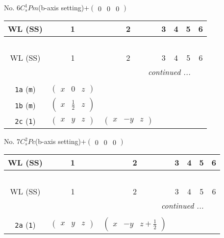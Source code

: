 \documentclass[fleqn,9pt,landscape]{jsarticle}
\begin{document}
\newpage
No. 6\quad$C_{s}^{1}$\quad$Pm$\quad(b-axis setting)\quad[ monoclinic ]\quad$+\begin{pmatrix} 0 & 0 & 0 \end{pmatrix}$
\begin{center}
\renewcommand{\arraystretch}{1.2}
\begin{longtable}{ccccccc}
 \hline \hline
WL (SS) & 1 & 2 & 3 & 4 & 5 & 6 \\ \hline \endfirsthead

\multicolumn{6}{l}{\tablename\ \thetable{}} \\
 \hline \hline
WL (SS) & 1 & 2 & 3 & 4 & 5 & 6 \\ \hline \endhead

 \hline \hline
\multicolumn{6}{r}{\footnotesize\it continued ...} \\ \endfoot

 \hline \hline
\multicolumn{6}{r}{} \\ \endlastfoot

{\tt 1a} ({\tt m}) & $ \begin{pmatrix} x & 0 & z \end{pmatrix} $ & $  $ \\ \hline
{\tt 1b} ({\tt m}) & $ \begin{pmatrix} x & \frac{1}{2} & z \end{pmatrix} $ & $  $ \\ \hline
{\tt 2c} ({\tt 1}) & $ \begin{pmatrix} x & y & z \end{pmatrix} $ & $ \begin{pmatrix} x & - y & z \end{pmatrix} $ \\
\end{longtable}
\end{center}
\newpage
No. 7\quad$C_{s}^{2}$\quad$Pc$\quad(b-axis setting)\quad[ monoclinic ]\quad$+\begin{pmatrix} 0 & 0 & 0 \end{pmatrix}$
\begin{center}
\renewcommand{\arraystretch}{1.2}
\begin{longtable}{ccccccc}
 \hline \hline
WL (SS) & 1 & 2 & 3 & 4 & 5 & 6 \\ \hline \endfirsthead

\multicolumn{6}{l}{\tablename\ \thetable{}} \\
 \hline \hline
WL (SS) & 1 & 2 & 3 & 4 & 5 & 6 \\ \hline \endhead

 \hline \hline
\multicolumn{6}{r}{\footnotesize\it continued ...} \\ \endfoot

 \hline \hline
\multicolumn{6}{r}{} \\ \endlastfoot

{\tt 2a} ({\tt 1}) & $ \begin{pmatrix} x & y & z \end{pmatrix} $ & $ \begin{pmatrix} x & - y & z + \frac{1}{2} \end{pmatrix} $ \\
\end{longtable}
\end{center}
\end{document}
